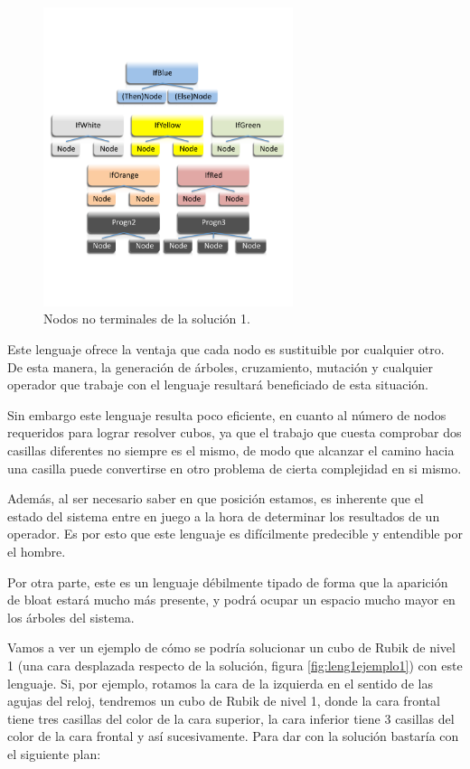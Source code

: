 \begin{figure}[t]
\centering
\includegraphics[width=0.65\textwidth]{figs/pdf/leng1nodosnoterm}
\caption{Nodos no terminales de la solución 1.}
\label{fig:leng1nodosnoterm}
\end{figure}



Este lenguaje ofrece la ventaja que cada nodo es sustituible por cualquier otro.
De esta manera, la generación de árboles, cruzamiento, mutación y cualquier
operador que trabaje con el lenguaje resultará beneficiado de esta situación.

Sin embargo este lenguaje resulta poco eficiente, en cuanto al número de nodos
requeridos para lograr resolver cubos, ya que el trabajo que cuesta comprobar dos
casillas diferentes no siempre es el mismo, de modo que alcanzar el camino hacia
una casilla puede convertirse en otro problema de cierta complejidad en si mismo.

Además, al ser necesario saber en que posición estamos, es inherente que el
estado del sistema entre en juego a la hora de determinar los resultados de un
operador. Es por esto que este lenguaje es difícilmente predecible y entendible
por el hombre.

Por otra parte, este es un lenguaje débilmente tipado de forma que la aparición
de bloat estará mucho más presente, y podrá ocupar un espacio mucho mayor en los
árboles del sistema.

Vamos a ver un ejemplo de cómo se podría solucionar un cubo de Rubik de nivel 1
(una cara desplazada respecto de la solución, figura \ref{fig:leng1ejemplo1})
con este lenguaje. Si, por ejemplo, rotamos la cara de la izquierda en el sentido de las agujas del reloj, tendremos
un cubo de Rubik de nivel 1, donde la cara frontal tiene tres casillas del color
de la cara superior, la cara inferior tiene 3 casillas del color de la cara
frontal y así sucesivamente. Para dar con la solución bastaría con el siguiente
plan:

